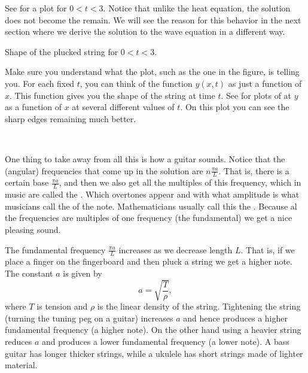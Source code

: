 \begin{example}
See 
 for a plot
for $0 < t < 3$.  Notice
that unlike the heat equation, the solution does not become
the  remain.  We will see the reason for this behavior in the
next section where we derive the solution to the wave equation in a different
way.

\begin{myfig}
\capstart
{}
\caption{Shape of the plucked string for $0 < t < 3$.\label{wave:pluckedexfig}}
\end{myfig}

Make sure you understand what the plot, such as the one in the figure, is
telling you.  For each fixed $t$, you can think of the function 
$y(x,t)$ as just a function of $x$.  This function gives you the shape of the
string at time $t$.  See  for plots of
at $y$ as a function of $x$ at several different values of $t$.
On this plot you can see the sharp edges remaining much better.

\begin{myfig}
\capstart
\\[5pt]
\caption{Plucked string for $t=0$, $t=0.4$, $t=0.8$, and
$t=1.2$.%
\label{wave:pluckedtsfig}}
\end{myfig}
\end{example}

One thing to take away from all this is how a guitar sounds.  Notice that
the (angular) frequencies that come up in the solution are
$n \frac{\pi a}{L}$.  That is, there is a certain base
\emph{} $\frac{\pi a}{L}$, and then we also
get all the multiples of this frequency, which in music are called
the \emph{}.  Which overtones appear and with what amplitude
is what musicians call the \emph{} of the note.
Mathematicians usually call this the \emph{}.
Because al the frequencies are multiples of one frequency (the fundamental)
we get a nice pleasing sound.

The fundamental frequency $\frac{\pi a}{L}$ increases as we decrease length $L$.  That is, if
we place a finger on the fingerboard and then pluck a string we get a higher
note.  The constant $a$ is given by
\begin{equation*}
a = \sqrt{\frac{T}{\rho}} ,
\end{equation*}
where $T$ is tension and $\rho$ is the linear density of the string.
Tightening the string (turning the tuning peg on a guitar) increases $a$ and
hence produces a higher fundamental frequency (a higher note).
On the other hand using a heavier string 
reduces $a$ and produces a lower fundamental frequency (a lower note).
A bass guitar has longer thicker strings, while a ukulele has short strings
made of lighter material.

